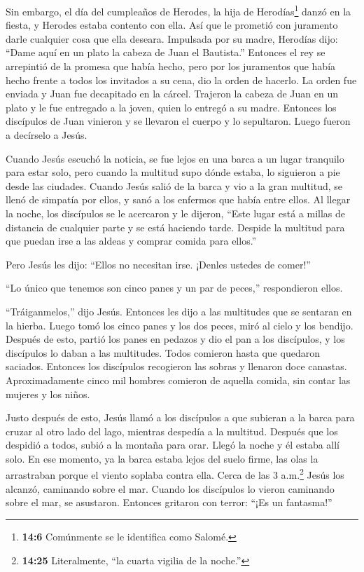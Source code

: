  Sin embargo, el día del cumpleaños de Herodes, la hija de
Herodías\footnote{\textbf{14:6} Comúnmente se le identifica como Salomé.}
danzó en la fiesta, y Herodes estaba contento con ella.  Así
que le prometió con juramento darle cualquier cosa que ella deseara.
 Impulsada por su madre, Herodías dijo: ``Dame aquí en un
plato la cabeza de Juan el Bautista.''  Entonces el rey se
arrepintió de la promesa que había hecho, pero por los juramentos que
había hecho frente a todos los invitados a su cena, dio la orden de
hacerlo.  La orden fue enviada y Juan fue decapitado en la
cárcel.  Trajeron la cabeza de Juan en un plato y le fue
entregado a la joven, quien lo entregó a su madre. 
Entonces los discípulos de Juan vinieron y se llevaron el cuerpo y lo
sepultaron. Luego fueron a decírselo a Jesús.

 Cuando Jesús escuchó la noticia, se fue lejos en una barca
a un lugar tranquilo para estar solo, pero cuando la multitud supo dónde
estaba, lo siguieron a pie desde las ciudades.  Cuando
Jesús salió de la barca y vio a la gran multitud, se llenó de simpatía
por ellos, y sanó a los enfermos que había entre ellos.  Al
llegar la noche, los discípulos se le acercaron y le dijeron, ``Este
lugar está a millas de distancia de cualquier parte y se está haciendo
tarde. Despide la multitud para que puedan irse a las aldeas y comprar
comida para ellos.''

 Pero Jesús les dijo: ``Ellos no necesitan irse. ¡Denles
ustedes de comer!''

 ``Lo único que tenemos son cinco panes y un par de
peces,'' respondieron ellos.

 ``Tráiganmelos,'' dijo Jesús.  Entonces les
dijo a las multitudes que se sentaran en la hierba. Luego tomó los cinco
panes y los dos peces, miró al cielo y los bendijo. Después de esto,
partió los panes en pedazos y dio el pan a los discípulos, y los
discípulos lo daban a las multitudes.  Todos comieron hasta
que quedaron saciados. Entonces los discípulos recogieron las sobras y
llenaron doce canastas.  Aproximadamente cinco mil hombres
comieron de aquella comida, sin contar las mujeres y los niños.

 Justo después de esto, Jesús llamó a los discípulos a que
subieran a la barca para cruzar al otro lado del lago, mientras despedía
a la multitud.  Después que los despidió a todos, subió a
la montaña para orar. Llegó la noche y él estaba allí solo.
 En ese momento, ya la barca estaba lejos del suelo firme,
las olas la arrastraban porque el viento soplaba contra ella.
 Cerca de las 3 a.m.\footnote{\textbf{14:25} Literalmente,
  ``la cuarta vigilia de la noche.''} Jesús los alcanzó, caminando sobre
el mar.  Cuando los discípulos lo vieron caminando sobre el
mar, se asustaron. Entonces gritaron con terror: ``¡Es un fantasma!''


